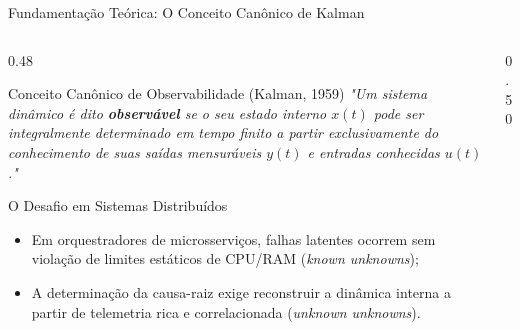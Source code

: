 \documentclass[aspectratio=169, 10pt]{beamer}
\begin{document}
\begin{frame}{Fundamentação Teórica: O Conceito Canônico de Kalman}
  \begin{columns}[T]
    \begin{column}{0.48\textwidth}
      \begin{block}{Conceito Canônico de Observabilidade (Kalman, 1959)}
        \small \textit{"Um sistema dinâmico é dito \textbf{observável} se o seu estado interno $x(t)$ pode ser integralmente determinado em tempo finito a partir exclusivamente do conhecimento de suas saídas mensuráveis $y(t)$ e entradas conhecidas $u(t)$."}
      \end{block}
      \vspace{0.8ex}
      \begin{alertblock}{O Desafio em Sistemas Distribuídos}
        \small
        \begin{itemize}
          \item Em orquestradores de microsserviços, falhas latentes ocorrem sem violação de limites estáticos de CPU/RAM (\textit{known unknowns});
          \item A determinação da causa-raiz exige reconstruir a dinâmica interna a partir de telemetria rica e correlacionada (\textit{unknown unknowns}).
        \end{itemize}
      \end{alertblock}
    \end{column}
    
    \begin{column}{0.50\textwidth}
      \centering
\end{column}
\end{columns}
\end{frame}
\end{document}
